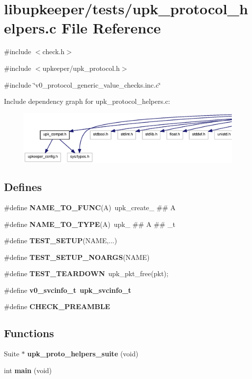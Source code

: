 \section{libupkeeper/tests/upk\_\-protocol\_\-helpers.c File Reference}
\label{upk__protocol__helpers_8c}
{\ttfamily \#include $<$check.h$>$}\par
{\ttfamily \#include $<$upkeeper/upk\_\-protocol.h$>$}\par
{\ttfamily \#include \char`\"{}v0\_\-protocol\_\-generic\_\-value\_\-checks.inc.c\char`\"{}}\par
Include dependency graph for upk\_\-protocol\_\-helpers.c:
\nopagebreak
\begin{figure}[H]
\begin{center}
\leavevmode
\includegraphics[width=400pt]{upk__protocol__helpers_8c__incl}
\end{center}
\end{figure}
\subsection*{Defines}
\begin{DoxyCompactItemize}
\item 
\#define {\bf NAME\_\-TO\_\-FUNC}(A)~upk\_\-create\_\- \#\# A
\item 
\#define {\bf NAME\_\-TO\_\-TYPE}(A)~upk\_\- \#\# A \#\# \_\-t
\item 
\#define {\bf TEST\_\-SETUP}(NAME,...)
\item 
\#define {\bf TEST\_\-SETUP\_\-NOARGS}(NAME)
\item 
\#define {\bf TEST\_\-TEARDOWN}~upk\_\-pkt\_\-free(pkt);
\item 
\#define {\bf v0\_\-svcinfo\_\-t}~{\bf upk\_\-svcinfo\_\-t}
\item 
\#define {\bf CHECK\_\-PREAMBLE}
\end{DoxyCompactItemize}
\subsection*{Functions}
\begin{DoxyCompactItemize}
\item 
Suite $\ast$ {\bf upk\_\-proto\_\-helpers\_\-suite} (void)
\item 
int {\bf main} (void)
\end{DoxyCompactItemize}


